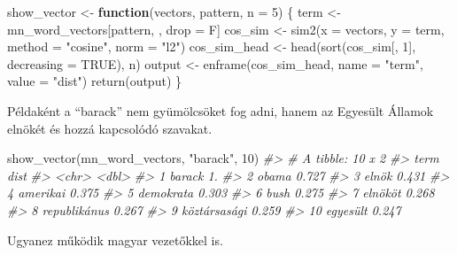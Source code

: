 \documentclass[
]{book}
\newenvironment{Shaded}{\begin{snugshade}}{\end{snugshade}}
\newcommand{\AttributeTok}[1]{\textcolor[rgb]{0.77,0.63,0.00}{#1}}
\newcommand{\CommentTok}[1]{\textcolor[rgb]{0.56,0.35,0.01}{\textit{#1}}}
\newcommand{\ConstantTok}[1]{\textcolor[rgb]{0.00,0.00,0.00}{#1}}
\newcommand{\ControlFlowTok}[1]{\textcolor[rgb]{0.13,0.29,0.53}{\textbf{#1}}}
\newcommand{\DecValTok}[1]{\textcolor[rgb]{0.00,0.00,0.81}{#1}}
\newcommand{\FunctionTok}[1]{\textcolor[rgb]{0.00,0.00,0.00}{#1}}
\newcommand{\NormalTok}[1]{#1}
\newcommand{\OtherTok}[1]{\textcolor[rgb]{0.56,0.35,0.01}{#1}}
\newcommand{\StringTok}[1]{\textcolor[rgb]{0.31,0.60,0.02}{#1}}
\begin{document}
\begin{Shaded}
\begin{Highlighting}[]
\NormalTok{show\_vector }\OtherTok{\textless{}{-}} \ControlFlowTok{function}\NormalTok{(vectors, pattern, }\AttributeTok{n =} \DecValTok{5}\NormalTok{) \{}
\NormalTok{  term }\OtherTok{\textless{}{-}}\NormalTok{ mn\_word\_vectors[pattern, , drop }\OtherTok{=}\NormalTok{ F]}
\NormalTok{  cos\_sim }\OtherTok{\textless{}{-}} \FunctionTok{sim2}\NormalTok{(}\AttributeTok{x =}\NormalTok{ vectors, }\AttributeTok{y =}\NormalTok{ term, }\AttributeTok{method =} \StringTok{"cosine"}\NormalTok{, }\AttributeTok{norm =} \StringTok{"l2"}\NormalTok{)}
\NormalTok{  cos\_sim\_head }\OtherTok{\textless{}{-}} \FunctionTok{head}\NormalTok{(}\FunctionTok{sort}\NormalTok{(cos\_sim[, }\DecValTok{1}\NormalTok{], }\AttributeTok{decreasing =} \ConstantTok{TRUE}\NormalTok{), n)}
\NormalTok{  output }\OtherTok{\textless{}{-}} \FunctionTok{enframe}\NormalTok{(cos\_sim\_head, }\AttributeTok{name =} \StringTok{"term"}\NormalTok{, }\AttributeTok{value =} \StringTok{"dist"}\NormalTok{)}
  \FunctionTok{return}\NormalTok{(output)}
\NormalTok{\}}
\end{Highlighting}
\end{Shaded}

Példaként a ``barack'' nem gyümölcsöket fog adni, hanem az Egyesült
Államok elnökét és hozzá kapcsolódó szavakat.

\begin{Shaded}
\begin{Highlighting}[]
\FunctionTok{show\_vector}\NormalTok{(mn\_word\_vectors, }\StringTok{"barack"}\NormalTok{, }\DecValTok{10}\NormalTok{)}
\CommentTok{\#\textgreater{} \# A tibble: 10 x 2}
\CommentTok{\#\textgreater{}    term          dist}
\CommentTok{\#\textgreater{}    \textless{}chr\textgreater{}        \textless{}dbl\textgreater{}}
\CommentTok{\#\textgreater{}  1 barack       1.   }
\CommentTok{\#\textgreater{}  2 obama        0.727}
\CommentTok{\#\textgreater{}  3 elnök        0.431}
\CommentTok{\#\textgreater{}  4 amerikai     0.375}
\CommentTok{\#\textgreater{}  5 demokrata    0.303}
\CommentTok{\#\textgreater{}  6 bush         0.275}
\CommentTok{\#\textgreater{}  7 elnököt      0.268}
\CommentTok{\#\textgreater{}  8 republikánus 0.267}
\CommentTok{\#\textgreater{}  9 köztársasági 0.259}
\CommentTok{\#\textgreater{} 10 egyesült     0.247}
\end{Highlighting}
\end{Shaded}

Ugyanez működik magyar vezetőkkel is.
\end{document}
